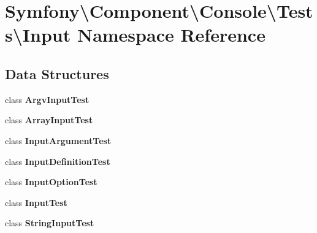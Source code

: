 \section{Symfony\textbackslash{}Component\textbackslash{}Console\textbackslash{}Tests\textbackslash{}Input Namespace Reference}
\label{namespace_symfony_1_1_component_1_1_console_1_1_tests_1_1_input}
\subsection*{Data Structures}
\begin{DoxyCompactItemize}
\item 
class {\bf Argv\+Input\+Test}
\item 
class {\bf Array\+Input\+Test}
\item 
class {\bf Input\+Argument\+Test}
\item 
class {\bf Input\+Definition\+Test}
\item 
class {\bf Input\+Option\+Test}
\item 
class {\bf Input\+Test}
\item 
class {\bf String\+Input\+Test}
\end{DoxyCompactItemize}
